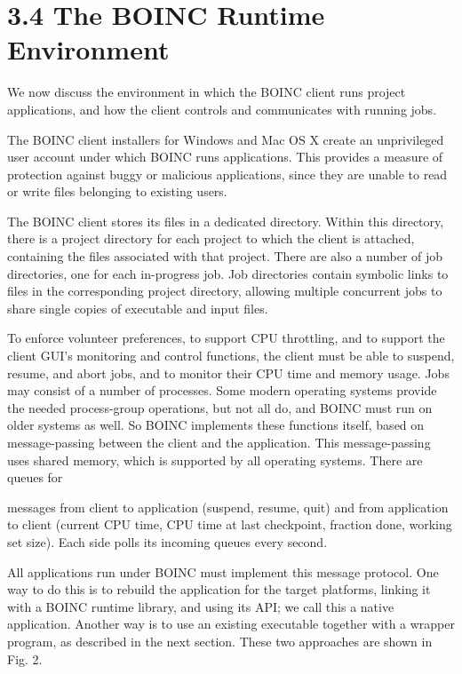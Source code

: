 \documentclass[
]{article}
\begin{document}
\section{3.4 The BOINC Runtime
Environment}\label{the-boinc-runtime-environment}

We now discuss the environment in which the BOINC client runs project
applications, and how the client controls and communicates with running
jobs.

The BOINC client installers for Windows and Mac OS X create an
unprivileged user account under which BOINC runs applications. This
provides a measure of protection against buggy or malicious
applications, since they are unable to read or write files belonging to
existing users.

The BOINC client stores its files in a dedicated directory. Within this
directory, there is a project directory for each project to which the
client is attached, containing the files associated with that project.
There are also a number of job directories, one for each in-progress
job. Job directories contain symbolic links to files in the
corresponding project directory, allowing multiple concurrent jobs to
share single copies of executable and input files.

To enforce volunteer preferences, to support CPU throttling, and to
support the client GUI's monitoring and control functions, the client
must be able to suspend, resume, and abort jobs, and to monitor their
CPU time and memory usage. Jobs may consist of a number of processes.
Some modern operating systems provide the needed process-group
operations, but not all do, and BOINC must run on older systems as well.
So BOINC implements these functions itself, based on message-passing
between the client and the application. This message-passing uses shared
memory, which is supported by all operating systems. There are queues
for

messages from client to application (suspend, resume, quit) and from
application to client (current CPU time, CPU time at last checkpoint,
fraction done, working set size). Each side polls its incoming queues
every second.

All applications run under BOINC must implement this message protocol.
One way to do this is to rebuild the application for the target
platforms, linking it with a BOINC runtime library, and using its API;
we call this a native application. Another way is to use an existing
executable together with a wrapper program, as described in the next
section. These two approaches are shown in Fig. 2.
\end{document}
